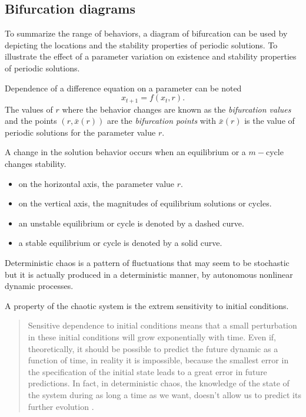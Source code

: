 \subsection{Bifurcation diagrams}
To summarize the range of behaviors, a diagram of bifurcation can be used by  depicting the locations and the stability properties of periodic solutions. To illustrate the effect of a parameter variation on existence and stability properties of periodic solutions. 

Dependence of a difference equation on a parameter can be noted
$$x_{t+1}=f(x_t,r).$$
The values of $r$ where the behavior changes are known as the \emph{bifurcation values} and the points $(r,\bar x(r))$ are the \emph{bifurcation points}  with $\bar x(r)$ is the value of periodic solutions for the parameter value $r$.

A change in the solution behavior occurs when an equilibrium or a $m-$cycle changes stability.

\begin{itemize}
\item on the horizontal axis, the parameter value $r$.
\item on the vertical axis, the magnitudes of equilibrium solutions or cycles.
\item an unstable equilibrium or cycle is denoted by a dashed curve.
\item a stable equilibrium or cycle is denoted by a solid curve.
\end{itemize}


\begin{definition}
Deterministic chaos is a pattern of fluctuations that may seem to be stochastic but it is actually produced in a deterministic manner, by autonomous nonlinear dynamic processes.
\end{definition}

A property of the chaotic system is the extrem sensitivity to initial conditions. 
\begin{quote} 
Sensitive dependence to initial conditions means that
a small perturbation in these initial conditions will grow exponentially with time. Even
if, theoretically, it should be possible to predict the future dynamic as a function of
time, in reality it is impossible, because the smallest error in the specification of the
initial state leads to a great error in future predictions. In fact, in deterministic chaos,
the knowledge of the state of the system during as long a time as we want, doesn't
allow us to predict its further evolution \cite{Glass1988}.
\end{quote}

